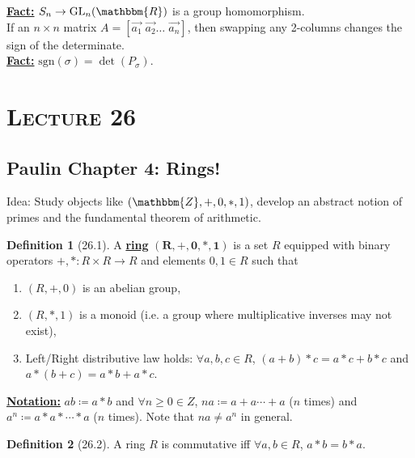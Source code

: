 \documentclass{article}
\newcommand{\Z}{\mathbbm{Z}}
\newcommand{\R}{\mathbbm{R}}
\newcommand{\coleq}{\coloneqq}
\newcommand{\define}[1]{\textbf{\underline{#1}}}
\newcommand{\func}[3]{#1: #2 \to #3}
\theoremstyle{definition}
\newtheorem*{defn}{Definition}
\theoremstyle{remark}
\newcommand{\sgn}{\mathrm{sgn}}
\begin{document}
{{            \noindent \define{Fact:} $S_n \to \mathrm{GL}_n(\R)$ is a group homomorphism.\\
            
            \noindent If an $n\times n$ matrix $A=[\Vec{a_1}\;\Vec{a_2}\ldots\;\Vec{a_n}]$, then swapping any 2-columns changes the sign of the determinate.\\
        
            \noindent\define{Fact:} $\sgn(\sigma)=\det(P_\sigma)$.
        }
    }
    
    \section*{\textbf{\textsc{Lecture 26}}}{
        \subsection*{Paulin Chapter 4: Rings!}{
            \noindent Idea: Study objects like $(\Z,+,0,*,1)$, develop an abstract notion of primes and the fundamental theorem of arithmetic.
            
            \begin{defn}[26.1]
                A \define{ring} $\mathbf{(R,+,0,*,1)}$ is a set $R$ equipped with binary operators $\func{+,*}{R\times R}{R}$ and elements $0,1\in R$ such that
                \begin{enumerate}
                    \item $(R,+,0)$ is an abelian group,
                    \item $(R,*,1)$ is a monoid (i.e. a group where multiplicative inverses may not exist),
                    \item Left/Right distributive law holds: $\forall a,b,c\in R$, $(a+b)*c=a*c+b*c$ and $a*(b+c)=a*b+a*c$.
                \end{enumerate}
            \end{defn}
            
            \noindent \define{Notation:} $ab\coleq a*b$ and $\forall n\geq 0 \in Z$, $na\coleq a+a\cdots+a$ ($n$ times) and $a^n\coleq a*a*\cdots *a$ ($n$ times). Note that $na\neq a^n$ in general.
            
            \begin{defn}[26.2]
                A ring $R$ is commutative iff $\forall a,b \in R$, $a*b=b*a$.
            \end{defn}
        }
}
\end{document}
